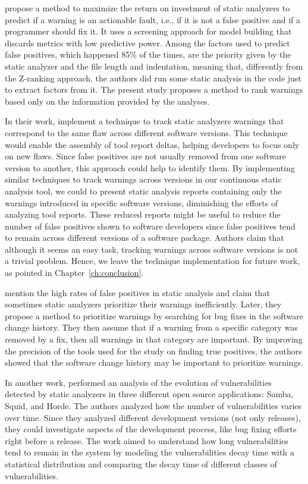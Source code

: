\cite{ruthruff_predicting_2008} propose a method to maximize
the return on investment of static analyzers to predict if a warning is an
actionable fault, i.e., if it is not a false positive and if a programmer
should fix it. It uses a screening approach for model building that discards
metrics with low predictive power. Among the factors used to predict false
positives, which happened 85\% of the times, are the priority given by the
static analyzer and the file length and indentation, meaning that, differently
from the Z-ranking approach, the authors did run some static analysis in the
code just to extract factors from it. The present study proposes a method to
rank warnings based only on the information provided by the analyses.

In their work, \cite{spacco_tracking_2006} implement a technique
to track static analyzers warnings that correspond to the same flaw across
different software versions. This technique would enable the assembly of tool report
deltas, helping developers to focus only on new flaws. Since false positives
are not usually removed from one software version to another, this approach
could help to identify them. By implementing similar techniques to track
warnings across versions in our continuous static analysis tool, we could to
present static analysis reports containing only the warnings introduced in
specific software versions, diminishing the efforts of analyzing tool reports.
These reduced reports might be useful to reduce the number of false positives shown to software
developers since false positives tend to remain across different versions of a
software package. Authors claim that although it seems an easy task, tracking warnings
across software versions is not a trivial problem. Hence, we leave the technique
implementation for future work, as pointed in Chapter~\ref{ch:conclusion}.

\cite{kim_which_2007} mention the high rates of false positives in
static analysis and claim that sometimes static analyzers prioritize their
warnings inefficiently. Later, they propose a method to prioritize
warnings by searching for bug fixes in the software change history. They then
assume that if a warning from a specific category was removed by a fix, then
all warnings in that category are important. By improving the precision of the
tools used for the study on finding true positives, the authors showed that the
software change history may be important to prioritize warnings.

In another work, \cite{penta_evolution_2008} performed an analysis
of the evolution of vulnerabilities detected by static analyzers in three
different open source applications: Samba, Squid, and Horde. The authors
analyzed how the number of vulnerabilities varies over time. Since they
analyzed different development versions (not only releases), they could investigate
aspects of the development process, like bug fixing efforts right before a
release. The work aimed to understand how long vulnerabilities tend
to remain in the system by modeling the vulnerabilities decay time with a
statistical distribution and comparing the decay time of different classes of
vulnerabilities.

